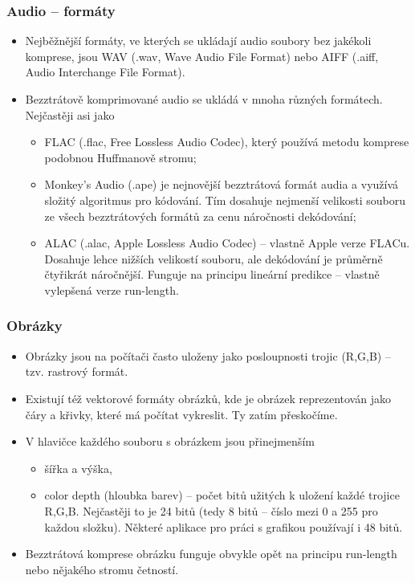 \documentclass[aspectratio=169,11pt,svgnames]{beamer}
\begin{document}
\begin{frame}
 \frametitle{Audio -- formáty}
 \vspace*{-1em}
 \begin{itemize}[label=\textbullet]
  \item Nejběžnější formáty, ve kterých se ukládají audio soubory \alert{bez
   jakékoli komprese}, jsou \alert{WAV} (.wav, Wave Audio File Format) nebo
   \alert{AIFF} (.aiff, Audio Interchange File Format).
  \item Bezztrátově komprimované audio se ukládá v mnoha různých formátech.
   Nejčastěji asi jako
   \begin{itemize}[label=\textemdash]
    \item \alert{FLAC} (.flac, Free Lossless Audio Codec), který používá metodu
     komprese podobnou Huffmanově stromu;
    \pause
    \item \alert{Monkey's Audio} (.ape) je nejnovější bezztrátová formát audia a
     využívá složitý algoritmus pro kódování. Tím dosahuje nejmenší velikosti
     souboru ze všech bezztrátových formátů za cenu náročnosti dekódování;
    \pause
    \item \alert{ALAC} (.alac, Apple Lossless Audio Codec) -- vlastně Apple
     verze FLACu. Dosahuje lehce nižších velikostí souboru, ale dekódování je
     průměrně čtyřikrát náročnější. Funguje na principu lineární predikce --
     vlastně vylepšená verze run-length.
   \end{itemize}
 \end{itemize}
\end{frame}

\begin{frame}
 \frametitle{Obrázky}
 \begin{itemize}[label=\textbullet]
  \item Obrázky jsou na počítači často uloženy jako posloupnosti trojic
   (R,G,B) -- tzv. \alert{rastrový formát}.\pause
  \item Existují též \alert{vektorové formáty} obrázků, kde je obrázek
   reprezentován jako čáry a křivky, které má počítat vykreslit. Ty zatím
   přeskočíme.
  \pause
  \item V hlavičce každého souboru s obrázkem jsou přinejmenším
  \begin{itemize}[label=\textemdash]
   \item šířka a výška,
   \pause
   \item \alert{color depth} (hloubka barev) -- počet bitů užitých k uložení
    každé trojice R,G,B. Nejčastěji to je 24 bitů (tedy 8 bitů -- číslo mezi 0 a
    255 pro každou složku). Některé aplikace pro práci s grafikou používají i 48
    bitů.
  \end{itemize}
  \pause
  \item Bezztrátová komprese obrázku funguje obvykle opět na principu run-length
   nebo nějakého stromu četností.
 \end{itemize}
\end{frame}
\end{document}
